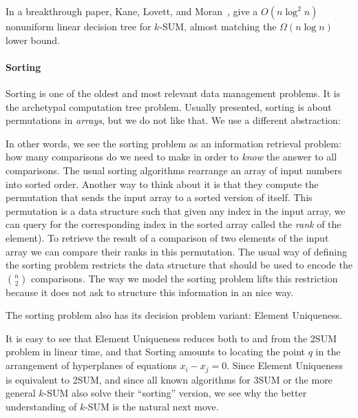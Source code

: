 In a breakthrough paper, Kane, Lovett, and Moran~\cite{KLM18}, give a
\(O(n \log^2 n)\) nonuniform linear decision tree for \(k\)-SUM, almost
matching the \(\Omega(n \log n)\) lower bound.


\paragraph{Sorting}
Sorting is one of the oldest and most relevant data management problems.
It is the archetypal computation tree problem.
%
Usually presented, sorting is about permutations in \emph{arrays}, but we do
not like that. We use a different abstraction:
%


In other words, we see the sorting problem as an information retrieval problem:
how many comparisons do we need to make in order to \emph{know} the answer to
all comparisons.
%
The usual sorting algorithms rearrange an array of input numbers into sorted
order. Another way to think about it is that they compute the permutation that
sends the input array to a sorted version of itself. This permutation is a data
structure such that given any index in the input array, we can query for the
corresponding index in the sorted array called the \emph{rank} of the element).
To retrieve the result of a comparison of two elements of the input array we can
compare their ranks in this permutation.
The usual way of defining the sorting problem restricts the data structure that
should be used to encode the \(n \choose 2\) comparisons.
The way we model the sorting problem lifts this restriction because it does not
ask to structure this information in an nice way.

The sorting problem also has its decision problem variant: Element Uniqueness.
%



It is easy to see that Element Uniqueness reduces both to and from the 2SUM
problem in linear time, and that Sorting amounts to locating the point \(q\) in
the arrangement of hyperplanes of equations \(x_i - x_j = 0\).
%
%
Since Element Uniqueness is equivalent to 2SUM, and since all known algorithms
for 3SUM or the more general \(k\)-SUM also solve their ``sorting'' version, we
see why the better understanding of \(k\)-SUM is the natural next move.

